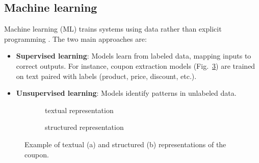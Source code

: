 \documentclass[licencjacka,en]{pracamgr}
\begin{document}
\subsection{Machine learning}
Machine learning (ML) trains systems using data rather than explicit programming \cite{francuz_3}. The two main approaches are:

\begin{itemize}
    \item \textbf{Supervised learning}: Models learn from labeled data, mapping inputs to correct outputs. For instance, coupon extraction models (Fig.~\ref{list:input}) are trained on text paired with labels (product, price, discount, etc.).

    \item \textbf{Unsupervised learning}: Models identify patterns in unlabeled data.
\end{itemize}

\begin{figure}[ht]
    \centering
    \begin{subfigure}{0.9\textwidth}
        \caption{textual representation}
        \label{list:tr}
    \end{subfigure}

    \vspace{5mm}

    \begin{subfigure}{0.9\textwidth}
        \caption{structured representation}
        \label{list:sr}
    \end{subfigure}

    \caption{Example of textual (a) and structured (b) representations of the coupon.}
    \label{list:input}
\end{figure}
\end{document}
